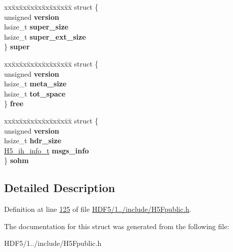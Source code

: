 \begin{DoxyCompactItemize}
\begin{tabbing}
\end{tabbing}\item 
\mbox{\label{struct_h5_f__info2__t_adaa6b8a031e28f991fbf371778ea42bc}} 
\begin{tabbing}
xx\=xx\=xx\=xx\=xx\=xx\=xx\=xx\=xx\=\kill
struct \{\\
\>unsigned {\bfseries version}\\
\>hsize\_t {\bfseries super\_size}\\
\>hsize\_t {\bfseries super\_ext\_size}\\
\} {\bfseries super}\\

\end{tabbing}\item 
\mbox{\label{struct_h5_f__info2__t_a345647ad67d946374e27a8fa9236ef4e}} 
\begin{tabbing}
xx\=xx\=xx\=xx\=xx\=xx\=xx\=xx\=xx\=\kill
struct \{\\
\>unsigned {\bfseries version}\\
\>hsize\_t {\bfseries meta\_size}\\
\>hsize\_t {\bfseries tot\_space}\\
\} {\bfseries free}\\

\end{tabbing}\item 
\mbox{\label{struct_h5_f__info2__t_ad7ec992925551d9f3dddd770c07a350d}} 
\begin{tabbing}
xx\=xx\=xx\=xx\=xx\=xx\=xx\=xx\=xx\=\kill
struct \{\\
\>unsigned {\bfseries version}\\
\>hsize\_t {\bfseries hdr\_size}\\
\>\hyperlink{struct_h5__ih__info__t}{H5\_ih\_info\_t} {\bfseries msgs\_info}\\
\} {\bfseries sohm}\\

\end{tabbing}\end{DoxyCompactItemize}


\subsection{Detailed Description}


Definition at line \hyperlink{_h_d_f5_21_810_81_2include_2_h5_fpublic_8h_source_l00125}{125} of file \hyperlink{_h_d_f5_21_810_81_2include_2_h5_fpublic_8h_source}{H\+D\+F5/1../include/\+H5\+Fpublic.\+h}.



The documentation for this struct was generated from the following file\+:\begin{DoxyCompactItemize}
\item 
H\+D\+F5/1../include/\+H5\+Fpublic.\+h\end{DoxyCompactItemize}
